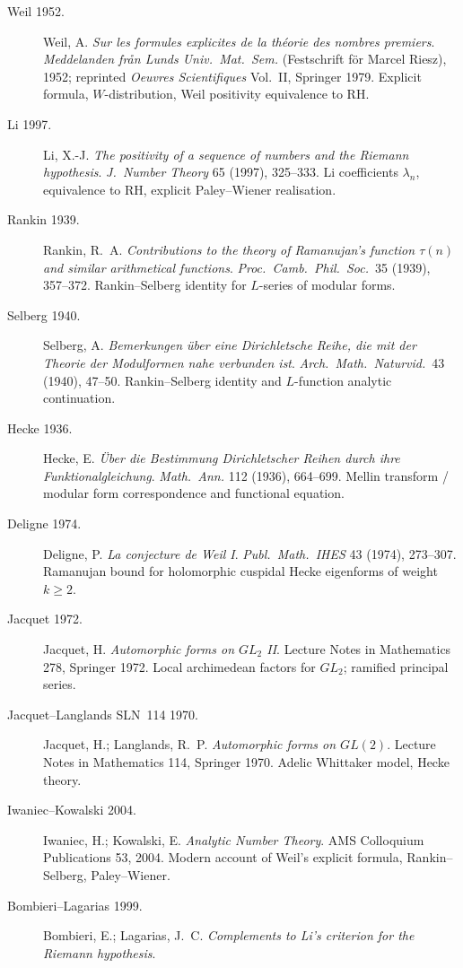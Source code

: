 \begin{description}
\item[Weil 1952.] Weil, A. \emph{Sur les formules explicites de la
th\'eorie des nombres premiers}. \emph{Meddelanden fr\r{a}n Lunds
Univ.~Mat.~Sem.} (Festschrift f\"or Marcel Riesz), 1952; reprinted
\emph{Oeuvres Scientifiques} Vol.~II, Springer 1979. Explicit formula,
\(W\)-distribution, Weil positivity equivalence to RH.
\item[Li 1997.] Li, X.-J. \emph{The positivity of a sequence of
numbers and the Riemann hypothesis}. \emph{J.~Number Theory} 65
(1997), 325--333. Li coefficients \(\lambda_{n}\),
equivalence to RH, explicit Paley--Wiener realisation.
\item[Rankin 1939.] Rankin, R.~A. \emph{Contributions to the theory
of Ramanujan's function \(\tau(n)\) and similar arithmetical functions}.
\emph{Proc.~Camb.~Phil.~Soc.}~35 (1939), 357--372. Rankin--Selberg
identity for \(L\)-series of modular forms.
\item[Selberg 1940.] Selberg, A. \emph{Bemerkungen \"uber eine
Dirichletsche Reihe, die mit der Theorie der Modulformen nahe
verbunden ist}. \emph{Arch.~Math.~Naturvid.}~43 (1940), 47--50.
Rankin--Selberg identity and \(L\)-function analytic continuation.
\item[Hecke 1936.] Hecke, E. \emph{\"Uber die Bestimmung Dirichletscher
Reihen durch ihre Funktionalgleichung}. \emph{Math.~Ann.} 112
(1936), 664--699. Mellin transform / modular form correspondence
and functional equation.
\item[Deligne 1974.] Deligne, P. \emph{La conjecture de Weil I}.
\emph{Publ.~Math.~IHES} 43 (1974), 273--307. Ramanujan bound for
holomorphic cuspidal Hecke eigenforms of weight \(k\geq 2\).
\item[Jacquet 1972.] Jacquet, H. \emph{Automorphic forms on \(GL_{2}\)
II}. Lecture Notes in Mathematics 278, Springer 1972. Local
archimedean factors for \(GL_{2}\); ramified principal series.
\item[Jacquet--Langlands SLN~114 1970.] Jacquet, H.;
Langlands, R.~P. \emph{Automorphic forms on \(GL(2)\)}. Lecture Notes
in Mathematics 114, Springer 1970. Adelic Whittaker model, Hecke
theory.
\item[Iwaniec--Kowalski 2004.] Iwaniec, H.; Kowalski, E.
\emph{Analytic Number Theory}. AMS Colloquium Publications 53, 2004.
Modern account of Weil's explicit formula, Rankin--Selberg,
Paley--Wiener.
\item[Bombieri--Lagarias 1999.] Bombieri, E.; Lagarias, J.~C.
\emph{Complements to Li's criterion for the Riemann hypothesis}.

\end{description}
